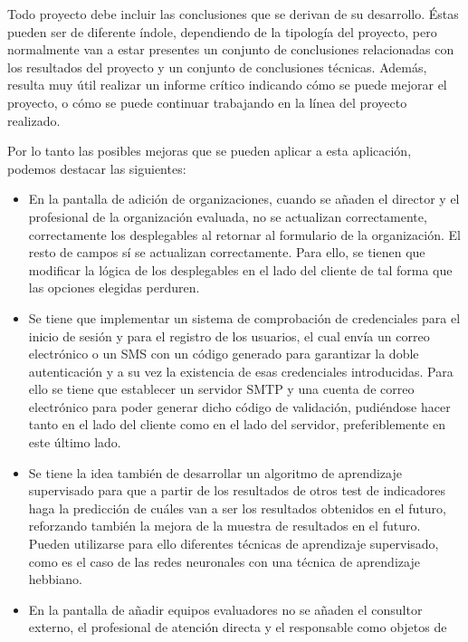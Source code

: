 
Todo proyecto debe incluir las conclusiones que se derivan de su desarrollo.
Éstas pueden ser de diferente índole, dependiendo de la tipología del proyecto,
pero normalmente van a estar presentes un conjunto de conclusiones relacionadas
con los resultados del proyecto y un conjunto de conclusiones técnicas. Además,
resulta muy útil realizar un informe crítico indicando cómo se puede mejorar el
proyecto, o cómo se puede continuar trabajando en la línea del proyecto
realizado. 

Por lo tanto las posibles mejoras que se pueden aplicar a esta aplicación,
podemos destacar las siguientes:
\begin{itemize}
    \item En la pantalla de adición de organizaciones, cuando se añaden el
    director y el profesional de la organización evaluada, no se actualizan
    correctamente, correctamente los desplegables al retornar al formulario de
    la organización. El resto de campos sí se actualizan correctamente. Para
    ello, se tienen que modificar la lógica de los desplegables en el lado del
    cliente de tal forma que las opciones elegidas perduren.
    \item Se tiene que implementar un sistema de comprobación de credenciales
    para el inicio de sesión y para el registro de los usuarios, el cual envía
    un correo electrónico o un SMS con un código generado para garantizar la
    doble autenticación y a su vez la existencia de esas credenciales
    introducidas. Para ello se tiene que establecer un servidor SMTP y
    una cuenta de correo electrónico para poder generar dicho código de
    validación, pudiéndose hacer tanto en el lado del cliente como en el lado
    del servidor, preferiblemente en este último lado.
    \item Se tiene la idea también de desarrollar un algoritmo de aprendizaje
    supervisado para que a partir de los resultados de otros test de indicadores
    haga la predicción de cuáles van a ser los resultados obtenidos en el
    futuro, reforzando también la mejora de la muestra de resultados en el
    futuro. Pueden utilizarse para ello diferentes técnicas de aprendizaje
    supervisado, como es el caso de las redes neuronales con una técnica de
    aprendizaje hebbiano.
    \item En la pantalla de añadir equipos evaluadores no se añaden el consultor
    externo, el profesional de atención directa y el responsable como objetos de

\end{itemize}
